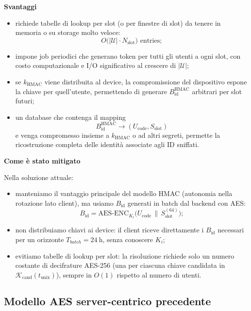 \documentclass[a4paper,11pt]{article}
\begin{document}
\textbf{Svantaggi}

\begin{itemize}[nosep]
  \item richiede tabelle di lookup per slot (o per finestre di slot) da tenere in memoria o su
        storage molto veloce:
        \[
          O\bigl(|\mathcal{U}| \cdot N_{\text{slot}}\bigr) \text{ entries};
        \]
  \item impone job periodici che generano token per tutti gli utenti a ogni slot, con costo
        computazionale e I/O significativo al crescere di \(|\mathcal{U}|\);
  \item se \(k_{\text{HMAC}}\) viene distribuita al device, la compromissione del dispositivo
        espone la chiave per quell’utente, permettendo di generare \(B_{\text{id}}^{\mathrm{HMAC}}\)
        arbitrari per slot futuri;
  \item un database che contenga il mapping
        \[
          B_{\text{id}}^{\mathrm{HMAC}} \longrightarrow (U_{\text{code}}, S_{\text{slot}})
        \]
        e venga compromesso insieme a \(k_{\text{HMAC}}\) o ad altri segreti, permette la
        ricostruzione completa delle identità associate agli ID sniffati.
\end{itemize}

\textbf{Come è stato mitigato}

Nella soluzione attuale:

\begin{itemize}[nosep]
  \item manteniamo il vantaggio principale del modello HMAC (autonomia nella rotazione lato
        client), ma usiamo \(B_{\text{id}}\) generati in batch dal backend con AES:
        \[
          B_{\text{id}} = \mathrm{AES\text{-}ENC}_{K_i}\bigl(U_{\text{code}} \,\|\, S_{\text{slot}}^{(64)}\bigr);
        \]
  \item non distribuiamo chiavi ai device: il client riceve direttamente i \(B_{\text{id}}\)
        necessari per un orizzonte \(T_{batch} = \SI{24}{\hour}\), senza conoscere \(K_i\);
  \item evitiamo tabelle di lookup per slot: la risoluzione richiede solo un numero costante di
        decifrature AES-256 (una per ciascuna chiave candidata in
        \(\mathcal{K}_{\mathrm{cand}}(t_{\text{unix}})\)), sempre in \(O(1)\) rispetto al numero di utenti.
\end{itemize}

\subsection{Modello AES server-centrico precedente}
\end{document}
